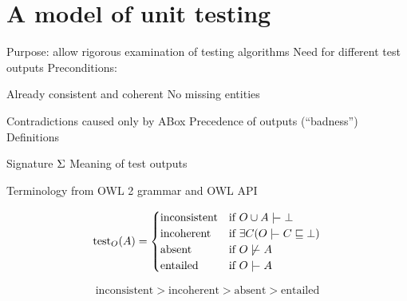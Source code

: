 \documentclass[paper.tex]{subfiles}
\begin{document}
\section{A model of unit testing}
\label{sec:model}

\begin{todos}
  \todo Purpose: allow rigorous examination of testing algorithms
  \todo Need for different test outputs
  \todo Preconditions:
  \begin{todos}
    \todo Already consistent and coherent
    \todo No missing entities
  \end{todos}
  \todo Contradictions caused only by ABox
  \todo Precedence of outputs (``badness'')
  \todo Definitions
  \begin{todos}
    \todo Signature $\Sigma$
    \todo Meaning of test outputs
  \end{todos}
  \todo Terminology from OWL 2 grammar and OWL API
\end{todos}

\[
  \test_O(A) =
  \begin{cases}
    \mathrm{inconsistent} &
      \text{if } O \union A \sementails \bot \\
    \mathrm{incoherent} &
      \text{if } \exists C (O \sementails C \sqsubseteq \nothing) \\
    \mathrm{absent} &
      \text {if } O \not\sementails A \\
    \mathrm{entailed} &
      \text{if } O \sementails A \\
  \end{cases}
\]

\[ \mathrm{inconsistent} > \mathrm{incoherent} > \mathrm{absent} > \mathrm{entailed} \]
\end{document}
